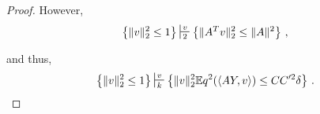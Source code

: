 \begin{proof}
However, 
\[ \left \{ \|v\|_2^2 \leq 1 \right \} \sststile{2}{v} \left \{ \|A^Tv\|_2^2 \leq \|A\|^2 \right \}\mcom \]

and thus, 
\[  \left \{ \|v\|_2^2 \leq 1 \right \} \sststile{k}{v} \left \{ \|v\|_2^2 \E q^2(\left \langle AY,v\rangle \right) \leq C C'^2 \delta \right \} \mper\] 









\end{proof} 


